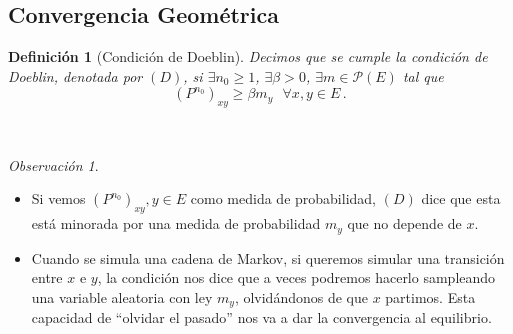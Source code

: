 \documentclass[letterpaper,11pt]{article} %
\theoremstyle{defbreak}
\newtheorem{definition}{Definición}[subsection]
\theoremstyle{propbreak}
\theoremstyle{remark}
\newtheorem{remark}{Observación}[subsection]
\theoremstyle{break}
\def\beforeitemize{\leavevmode \vspace{-0.5\baselineskip}}
\begin{document}
\subsection{Convergencia Geométrica}
\begin{definition}[Condición de Doeblin]
Decimos que se cumple la condición de Doeblin, denotada por $(D)$, si $\exists n_0\geq1$, $\exists\beta>0$, $\exists m\in\mathcal{P}(E)$ tal que
$$(P^{n_0})_{xy}\geq\beta m_y \mbox{ }\forall x,y\in E \, .$$
\end{definition}
\vspace{.5cm} \\
\begin{remark}
\beforeitemize
\begin{itemize}
    \item  Si vemos $(P^{n_0})_{xy},y\in E$ como medida de probabilidad, $(D)$ dice que esta está minorada por una medida de probabilidad $m_y$ que no depende de $x$.
    \item Cuando se simula una cadena de Markov, si queremos simular una transición entre $x$ e $y$, la condición nos dice que a veces podremos hacerlo sampleando una variable aleatoria con ley $m_y$, olvidándonos de que $x$ partimos. Esta capacidad de ``olvidar el pasado'' nos va a dar la convergencia al equilibrio.
\end{itemize}
\end{remark}
\end{document}
